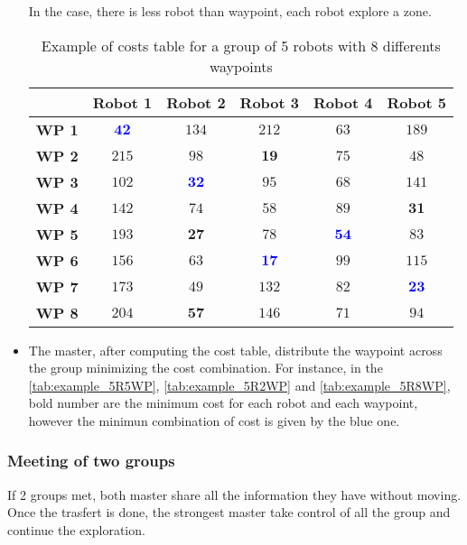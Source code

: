 \documentclass[../main.tex]{subfiles}
\begin{document}
\begin{itemize}
	In the case, there is less robot than waypoint, each robot explore a zone.
	
	\begin{table}[H]
		\centering
		\begin{tabular}{|c|c|c|c|c|c|}
			\hline
			& \textbf{Robot 1} & \textbf{Robot 2} & \textbf{Robot 3} & \textbf{Robot 4} & \textbf{Robot 5}\\
			\hline
			\textbf{WP 1} & \textcolor{blue}{$\mathbf{42}$} & $134$ & $212$ & $63$ & $189$ \\
			\hline
			\textbf{WP 2} & $215$ & $98$ & $\mathbf{19}$ & $75$ & $48$ \\
			\hline
			\textbf{WP 3} & $102$ & \textcolor{blue}{$\mathbf{32}$} & $95$ & $68$ & $141$ \\
			\hline
			\textbf{WP 4} & $142$ & $74$ & $58$ & $89$ & $\mathbf{31}$ \\
			\hline
			\textbf{WP 5} & $193$ & $\mathbf{27}$ & $78$ & \textcolor{blue}{$\mathbf{54}$} & $83$ \\ 
			\hline
			\textbf{WP 6} & $156$ & $63$ & \textcolor{blue}{$\mathbf{17}$} & $99$ & $115$ \\
			\hline
			\textbf{WP 7} & $173$ & $49$ & $132$ & $82$ & \textcolor{blue}{$\mathbf{23}$} \\
			\hline
			\textbf{WP 8} & $204$ & $\mathbf{57}$ & $146$ & $71$ & $94$ \\ 
			\hline
		\end{tabular}
		\caption{Example of costs table for a group of 5 robots with 8 differents waypoints}
		\label{tab:example_5R8WP}
	\end{table}

	\item The master, after computing the cost table, distribute the waypoint across the group minimizing the cost combination. For instance, in the \autoref{tab:example_5R5WP}, \autoref{tab:example_5R2WP} and \autoref{tab:example_5R8WP}, bold number are the minimum cost for each robot and each waypoint, however the minimun combination of cost is given by the blue one.

\end{itemize}

\subsubsection{Meeting of two groups}

If 2 groups met, both master share all the information they have without moving. Once the trasfert is done, the strongest master take control of all the group and continue the exploration.
\end{document}

